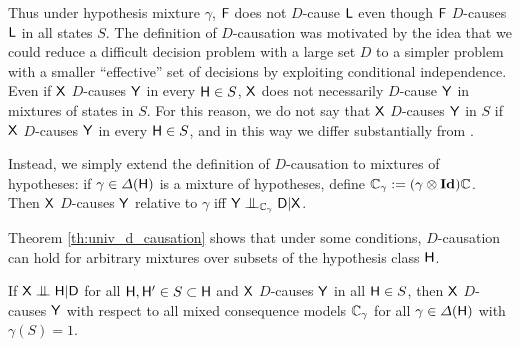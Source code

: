 Thus under hypothesis mixture $\gamma$, $\mathsf{F}$ does not $D$-cause $\mathsf{L}$ even though $\mathsf{F}$ $D$-causes $\mathsf{L}$ in all states $S$. The definition of $D$-causation was motivated by the idea that we could reduce a difficult decision problem with a large set $D$ to a simpler problem with a smaller ``effective'' set of decisions by exploiting conditional independence. Even if $\mathsf{X}$ $D$-causes $\mathsf{Y}$ in every $\mathsf{H}\in S$, $\mathsf{X}$ does not necessarily $D$-cause $\mathsf{Y}$ in mixtures of states in $S$. For this reason, we do not say that $\mathsf{X}$ $D$-causes $\mathsf{Y}$ in $S$ if $\mathsf{X}$ $D$-causes $\mathsf{Y}$ in every $\mathsf{H}\in S$, and in this way we differ substantially from \citet{heckerman_decision-theoretic_1995}.

Instead, we simply extend the definition of $D$-causation to mixtures of hypotheses: if $\gamma\in \Delta(\mathsf{H})$ is a mixture of hypotheses, define $\mathbb{C}_\gamma:= (\gamma\otimes\textbf{Id})\mathbb{C}$. Then $\mathsf{X}$ $D$-causes $\mathsf{Y}$ relative to $\gamma$ iff $\RV{Y}\CI_{\kernel{C}_\gamma} \RV{D}|\RV{X}$.

Theorem \ref{th:univ_d_causation} shows that under some conditions, $D$-causation can hold for arbitrary mixtures over subsets of the hypothesis class $\mathsf{H}$.

\begin{theorem}\label{th:univ_d_causation}
If $\RV{X}\CI\RV{H}|\RV{D}$ for all $\mathsf{H},\mathsf{H}'\in S\subset \mathsf{H}$ and $\mathsf{X}$ $D$-causes $\mathsf{Y}$ in all $\mathsf{H}\in S$, then $\mathsf{X}$ $D$-causes $\mathsf{Y}$ with respect to all mixed consequence models $\mathbb{C}_\gamma$ for all $\gamma\in \Delta(\mathsf{H})$ with $\gamma(S)=1$.
\end{theorem}

